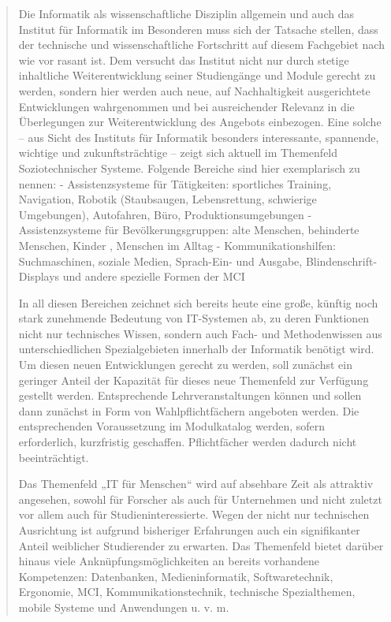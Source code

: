\begin{quote}
Die Informatik als wissenschaftliche Disziplin allgemein und auch das
Institut für Informatik im Besonderen muss sich der Tatsache stellen,
dass der technische und wissenschaftliche Fortschritt auf diesem
Fachgebiet nach wie vor rasant ist. Dem versucht das Institut nicht nur
durch stetige inhaltliche Weiterentwicklung seiner Studiengänge und
Module gerecht zu werden, sondern hier werden auch neue, auf
Nachhaltigkeit ausgerichtete Entwicklungen wahrgenommen und bei
ausreichender Relevanz in die Überlegungen zur Weiterentwicklung des
Angebots einbezogen. Eine solche -- aus Sicht des Instituts für
Informatik besonders interessante, spannende, wichtige und
zukunftsträchtige -- zeigt sich aktuell im Themenfeld Soziotechnischer
Systeme. Folgende Bereiche sind hier exemplarisch zu nennen: -
Assistenzsysteme für Tätigkeiten: sportliches Training, Navigation,
Robotik (Staubsaugen, Lebensrettung, schwierige Umgebungen), Autofahren,
Büro, Produktionsumgebungen - Assistenzsysteme für Bevölkerungsgruppen:
alte Menschen, behinderte Menschen, Kinder , Menschen im Alltag -
Kommunikationshilfen: Suchmaschinen, soziale Medien, Sprach-Ein- und
Ausgabe, Blindenschrift-Displays und andere spezielle Formen der MCI

In all diesen Bereichen zeichnet sich bereits heute eine große, künftig
noch stark zunehmende Bedeutung von IT-Systemen ab, zu deren Funktionen
nicht nur technisches Wissen, sondern auch Fach- und Methodenwissen aus
unterschiedlichen Spezialgebieten innerhalb der Informatik benötigt
wird. Um diesen neuen Entwicklungen gerecht zu werden, soll zunächst ein
geringer Anteil der Kapazität für dieses neue Themenfeld zur Verfügung
gestellt werden. Entsprechende Lehrveranstaltungen können und sollen
dann zunächst in Form von Wahlpflichtfächern angeboten werden. Die
entsprechenden Voraussetzung im Modulkatalog werden, sofern
erforderlich, kurzfristig geschaffen. Pflichtfächer werden dadurch nicht
beeinträchtigt.

Das Themenfeld „IT für Menschen`` wird auf absehbare Zeit als attraktiv
angesehen, sowohl für Forscher als auch für Unternehmen und nicht
zuletzt vor allem auch für Studieninteressierte. Wegen der nicht nur
technischen Ausrichtung ist aufgrund bisheriger Erfahrungen auch ein
signifikanter Anteil weiblicher Studierender zu erwarten. Das Themenfeld
bietet darüber hinaus viele Anknüpfungsmöglichkeiten an bereits
vorhandene Kompetenzen: Datenbanken, Medieninformatik, Softwaretechnik,
Ergonomie, MCI, Kommunikationstechnik, technische Spezialthemen, mobile
Systeme und Anwendungen u. v. m.


\end{quote}
